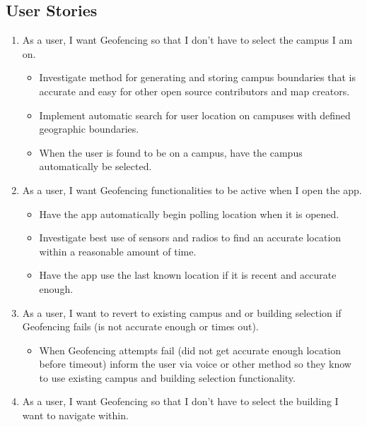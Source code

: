\documentclass{scrreprt}
\begin{document}
\subsection{User Stories}
\begin{enumerate}
	\item As a user, I want Geofencing so that I don't have to select the campus I am on.
	
		\begin{itemize}
			\item Investigate method for generating and storing campus boundaries that is accurate and easy for other open source contributors and map creators.
			\item Implement automatic search for user location on campuses with defined geographic boundaries.
			\item When the user is found to be on a campus, have the campus automatically be selected.
		\end{itemize}
		
	\item As a user, I want Geofencing functionalities to be active when I open the app.
	
		\begin{itemize}
			\item Have the app automatically begin polling location when it is opened.
			\item Investigate best use of sensors and radios to find an accurate location within a reasonable amount of time.
			\item Have the app use the last known location if it is recent and accurate enough.
		\end{itemize}
		
	\item As a user, I want to revert to existing campus and or building selection if Geofencing fails (is not accurate enough or times out).
	
		\begin{itemize}
			\item When Geofencing attempts fail (did not get accurate enough location before timeout) inform the user via voice or other method so they know to use existing campus and building selection functionality.
		\end{itemize}
		
	\item As a user, I want Geofencing so that I don't have to select the building I want to navigate within.
		\begin{itemize}
		

\end{itemize}
\end{enumerate}
\end{document}
